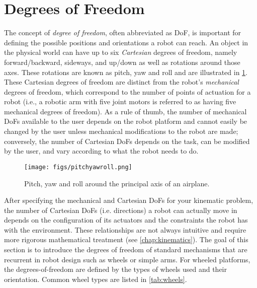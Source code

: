 \section{Degrees of Freedom}\label{sec:dof}

The concept of \textsl{degree of freedom}, often abbreviated as DoF, is important for defining the possible positions and orientations a robot can reach. An object in the physical world can have up to six \textsl{Cartesian} degrees of freedom, namely forward/backward, sideways, and up/down as well as rotations around those axes. These rotations are known as pitch, yaw and roll and are illustrated in \cref{fig:pitchyawandroll}. These Cartesian degrees of freedom are distinct from the robot's \textsl{mechanical} degrees of freedom, which correspond to the number of points of actuation for a robot (i.e., a robotic arm with five joint motors is referred to as having five mechanical degrees of freedom).
As a rule of thumb, the number of mechanical DoFs available to the user depends on the robot platform and cannot easily be changed by the user unless mechanical modifications to the robot are made; conversely, the number of Cartesian DoFs depends on the task, can be modified by the user, and vary according to what the robot needs to do.
\begin{figure}
	\centering
		\texttt{[image: figs/pitchyawroll.png]}
	\caption{Pitch, yaw and roll around the principal axis of an airplane.}
	\label{fig:pitchyawandroll}
\end{figure}

After specifying the mechanical and Cartesian DoFs for your kinematic problem, the number of Cartesian DoFs (i.e. directions) a robot can actually move in depends on the configuration of its actuators and the constraints the robot has with the environment. These relationships are not always intuitive and require more rigorous mathematical treatment (see \cref{chap:kinematics}). The goal of this section is to introduce the degrees of freedom of standard mechanisms that are recurrent in robot design such as wheels or simple arms. For wheeled platforms, the degrees-of-freedom are defined by the types of wheels used and their orientation. Common wheel types are listed in \cref{tab:wheels}.

